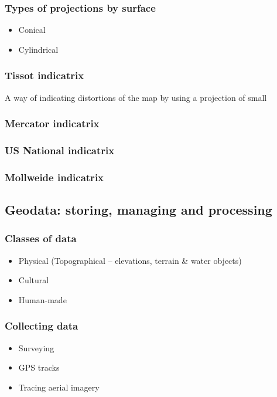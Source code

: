 \documentclass{beamer}
\begin{document}
\begin{frame}
  \frametitle{Types of projections by surface}
  \begin{itemize}
  \item Conical
  \item Cylindrical
  \end{itemize}
\end{frame}

\begin{frame}
  \frametitle{Tissot indicatrix}
  A way of indicating distortions of the map by using
  a projection of small
\end{frame}

\begin{frame}
  \frametitle{Mercator indicatrix}

\end{frame}

\begin{frame}
  \frametitle{US National indicatrix}

\end{frame}

\begin{frame}
  \frametitle{Mollweide indicatrix}

\end{frame}

\subsection{Geodata: storing, managing and processing }

\begin{frame}
  \frametitle{Classes of data}
  \begin{itemize}
  \item Physical (Topographical -- elevations, terrain \& water objects)
  \item Cultural
  \item Human-made
  \end{itemize}
\end{frame}

\begin{frame}
  \frametitle{Collecting data}
  \begin{itemize}
  \item Surveying
  \item GPS tracks
  \item Tracing aerial imagery
  \end{itemize}
\end{frame}
\end{document}
